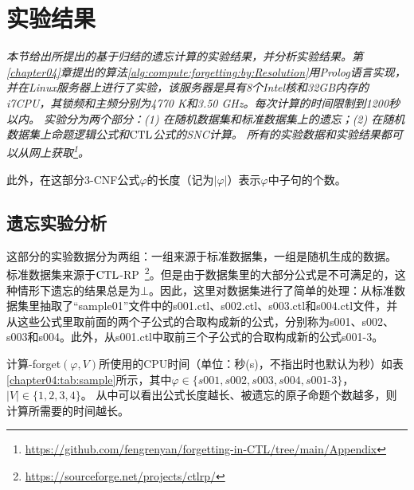 \chapter{实验结果}\label{chapter08}
{\em 本节给出所提出的基于归结的遗忘计算的实验结果，并分析实验结果。第\ref{chapter04}章提出的算法\ref{alg:compute:forgetting:by:Resolution}用Prolog语言实现，并在Linux服务器上进行了实验，该服务器是具有8个Intel核和32GB内存的i7CPU，其锁频和主频分别为4770 K和3.50 GHz。每次计算的时间限制到1200秒以内。
	实验分为两个部分：(1) 在随机数据集和标准数据集上的遗忘；(2) 在随机数据集上命题逻辑公式和$\textrm{CTL}$公式的SNC计算。
	所有的实验数据和实验结果都可以从网上获取\footnote{ \url{https://github.com/fengrenyan/forgetting-in-CTL/tree/main/Appendix}}。
	
	此外，在这部分3-CNF公式$\varphi$的长度（记为$|\varphi|$）表示$\varphi$中子句的个数。}





\section{遗忘实验分析}
这部分的实验数据分为两组：一组来源于标准数据集，一组是随机生成的数据。
标准数据集来源于$\textrm{CTL}$-RP~\footnote{\url{https://sourceforge.net/projects/ctlrp/}}。但是由于数据集里的大部分公式是不可满足的，这种情形下遗忘的结果总是为$\bot$。因此，这里对数据集进行了简单的处理：从标准数据集里抽取了“sample01”文件中的s001.ctl、s002.ctl、s003.ctl和s004.ctl文件，并从这些公式里取前面的两个子公式的合取构成新的公式，分别称为s001、s002、s003和s004。此外，从s001.ctl中取前三个子公式的合取构成新的公式s001-3。

计算{\CTL-forget}$(\varphi, V)$所使用的CPU时间（单位：秒(s)，不指出时也默认为秒）如表\ref{chapter04:tab:sample}所示，其中$\varphi\in \{s001,s002,s003,s004,s001$-$3\}$，$|V|\in \{1,2,3,4\}$。
从中可以看出公式长度越长、被遗忘的原子命题个数越多，则计算所需要的时间越长。

\begin{table}%
	\centering
	\caption{计算 \emph {ERes}$(\varphi,V)$所使用的CPU时间（单位：秒(s)）}\label{chapter04:tab:sample}
\end{table}

